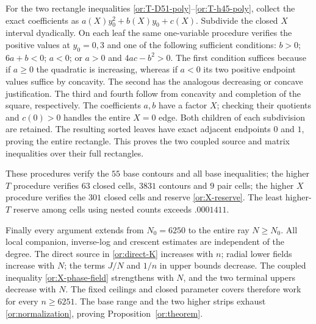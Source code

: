 For the two rectangle inequalities
\eqref{or:T-D51-poly}--\eqref{or:T-h45-poly}, collect the exact
coefficients as $a(X)y_0^2+b(X)y_0+c(X)$.  Subdivide the closed
$X$ interval dyadically.  On each leaf the same one-variable procedure
verifies the positive values at $y_0=0,3$ and one of the following
sufficient conditions: $b>0$; $6a+b<0$; $a<0$; or $a>0$ and
$4ac-b^2>0$.  The first condition suffices because if $a\ge0$ the
quadratic is increasing, whereas if $a<0$ its two positive endpoint
values suffice by concavity.  The second has the analogous decreasing
or concave justification.  The third and fourth follow from concavity
and completion of the square, respectively.
The coefficients $a,b$ have a factor $X$; checking their quotients
and $c(0)>0$ handles the entire $X=0$ edge.  Both children of each
subdivision are retained.  The resulting sorted leaves have exact
adjacent endpoints $0$ and $1$, proving the entire rectangle.
This proves the two coupled source and matrix inequalities over their
full rectangles.

These procedures verify the $55$ base contours and all base
inequalities; the higher $T$ procedure verifies $63$ closed cells,
$3831$ contours and $9$ pair cells; the higher $X$ procedure verifies
the $301$ closed cells and reserve \eqref{or:X-reserve}.
The least higher-$T$ reserve among cells using nested counts exceeds
$.0001411$.

Finally every argument extends from $N_0=6250$ to the entire ray
$N\ge N_0$.  All local companion, inverse-log and crescent estimates
are independent of the degree.  The direct source in
\eqref{or:direct-K} increases with $n$; radial lower fields increase
with $N$; the terms $J/N$ and $1/n$ in upper bounds decrease.
The coupled inequality \eqref{or:X-phase-field} strengthens with
$N$, and the two terminal uppers decrease with $N$.
The fixed ceilings and closed parameter covers therefore
work for every $n\ge6251$.  The base range and the two higher strips
exhaust \eqref{or:normalization}, proving
Proposition~\ref{or:theorem}.
